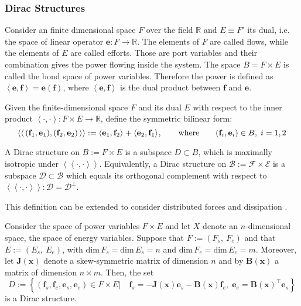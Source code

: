 \subsubsection{Dirac Structures}
Consider an  finite dimensional space ${F}$ over the field $\mathbb{R}$ and ${E} \equiv {F}'$ its dual, i.e. the space of linear operator $\mathbf{e} : {F} \rightarrow \mathbb{R}$. The elements of ${F}$ are called flows, while the elements of ${E}$ are called efforts. Those are port variables and their combination gives the power flowing inside the system. The space ${B} = {F} \times {E}$ is called the bond space of power variables. Therefore the power is defined as  $\left\langle \mathbf{e}, \mathbf{f} \right\rangle = \bm{e}(\mathbf{f})$, where $\left\langle \mathbf{e} , \mathbf{f} \right\rangle$ is the dual product between $\mathbf{f}$ and $\mathbf{e}$.
\begin{definition}
	Given the finite-dimensional space ${F}$ and its dual ${E}$ with respect to the inner product $\left\langle \cdot , \cdot \right\rangle : {F} \times {E} \rightarrow \mathbb{R}$, define the symmetric bilinear form:
	\begin{equation}
	\langle \langle \, (\mathbf{f}_1, \mathbf{e}_1), (\mathbf{f}_2, \mathbf{e}_2) \, \rangle \rangle := \langle \mathbf{e}_1, \mathbf{f}_2 \rangle_{} +  \langle \mathbf{e}_2, \mathbf{f}_1 \rangle_{}, \qquad \text{where} \qquad (\mathbf{f}_i, \mathbf{e}_i) \in {B}, \; i = 1, 2
	\end{equation}
	
	A Dirac structure on ${B} := {F} \times {E}$ is a subspace ${D} \subset {B}$, which is maximally isotropic under $\left\langle \left\langle \cdot, \cdot \right\rangle \right\rangle$.	Equivalently, a Dirac structure on $\mathcal{B} := \mathcal{F} \times \mathcal{E}$ is a subspace $\mathcal{D} \subset \mathcal{B}$ 	which equals its orthogonal complement with respect to $\left\langle \left\langle \cdot, \cdot \right\rangle \right\rangle: \mathcal{D} =\mathcal{D}^\perp$.
\end{definition}
This definition can be extended to consider distributed forces and dissipation \cite{villegas2007}.
\begin{proposition}
	\label{prop:Dirac}
	Consider the space of power variables ${F} \times {E}$ and let ${X}$ denote an $n$-dimensional space, the space of energy variables. Suppose that ${F} := ({F}_s, \ {F}_e )$ and that ${E} := ({E}_s,  \ {E}_e )$, with $\text{dim} \, {F}_s = \text{dim} \, {E}_s = n$ and $\text{dim} \, {F}_e = \text{dim} \, {E}_e = m$. Moreover, let $\mathbf{J}(\mathbf{x})$ denote
	a skew-symmetric matrix of dimension $n$ and by $\mathbf{B}(\mathbf{x})$ a matrix of dimension $n \times m$. Then, the set
	\begin{equation}
	{D} := \left\{ (\mathbf{f}_s, \mathbf{f}_e , \mathbf{e}_s ,\mathbf{e}_e ) \in {F} \times {E} \vert \quad \mathbf{f}_s = - \mathbf{J}(\mathbf{x}) \mathbf{e}_s - \mathbf{B}(\mathbf{x}) \mathbf{f}_e, \; \mathbf{e}_e = \mathbf{B}(\mathbf{x})^\top \mathbf{e}_s \right\}
	\end{equation}
	is a Dirac structure.
\end{proposition}

